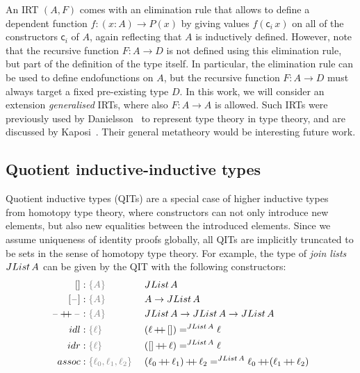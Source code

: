 \documentclass[a4paper,UKenglish,numberwithinsect,cleveref,thm-restate]{lipics-v2021}
\newcommand{\LT}[2][]{\todo[inline,author={L-T},caption={},color={pink},#1]{#2}}
\begin{document}
An IRT $(A, F)$ comes with an elimination rule that allows to define a dependent function  $f : (x : A) \to P(x)$ by giving values $f(\mathsf{c}_i\,x)$ on all of the constructors $\mathsf{c}_i$ of $A$, again reflecting that $A$ is inductively defined.
%
However, note that the recursive function $F : A \to D$ is not defined using this elimination rule, but part of the definition of the type itself.
%
In particular, the elimination rule can be used to define endofunctions on $A$, but the recursive function  $F : A \to D$ must always target a fixed pre-existing type $D$.
%
In this work, we will consider an extension \emph{generalised} IRTs, where also $F : A \to A$ is allowed.
%
Such IRTs were previously used by Danielsson~\cite{Danielsson2006} to represent type theory in type theory, and are discussed by Kaposi~\cite{Kaposi2023}.
%
Their general metatheory would be interesting future work.



\subsection{Quotient inductive-inductive types}

Quotient inductive types (QITs) are a special case of higher inductive types~\cite{Lumsdaine2020} from homotopy type theory, where constructors can not only introduce new elements, but also new equalities between the introduced elements.
%
Since we assume uniqueness of identity proofs globally, all QITs are implicitly truncated to be sets in the sense of homotopy type theory.
%
For example, the type of \emph{join lists} $\JList{A}$ can be given by the QIT
with the following constructors:
\begin{alignat*}{3}
  \Jnil                    & : \implicit{A}      && \JList{A} \\
  \Jsing{\blank}           & : \implicit{A}      && A \to \JList{A} \\
  \Jconcat{\blank}{\blank} & : \implicit{A}      && \JList{A} \to \JList{A} \to \JList{A} \\
  \mathsf{idl}             & : \implicit{\ell}\; && (\Jconcat{\ell}{\Jnil}) =^{\JList{A}} \ell \\
  \mathsf{idr}             & : \implicit{\ell}\; && (\Jconcat{\Jnil}{\ell}) =^{\JList{A}} \ell \\
  \mathsf{assoc}           & : \implicit{\ell_0, \ell_1, \ell_2}\; && \Jconcat{(\Jconcat{\ell_0}{\ell_1})}{\ell_2} =^{\JList{A}} \Jconcat{\ell_0}{(\Jconcat{\ell_1}{\ell_2})}
\end{alignat*}
\end{document}
